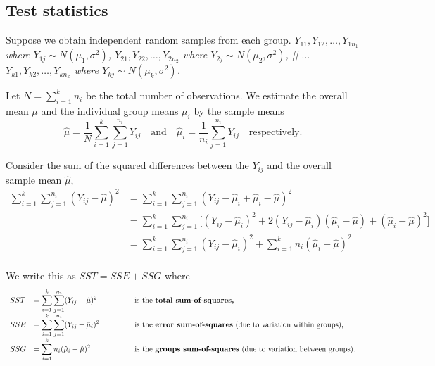 \subsection{Test statistics}

Suppose we obtain independent random samples from each group.
\bit
\it $Y_{11},Y_{12},\ldots,Y_{1n_1}$ where $Y_{1j}\sim N(\mu_1,\sigma^2)$,
\it $Y_{21},Y_{22},\ldots,Y_{2n_2}$ where $Y_{2j}\sim N(\mu_2,\sigma^2)$,
\it[] $\ldots$
\it $Y_{k1}, Y_{k2}, \ldots, Y_{kn_k}$ where $Y_{kj}\sim N(\mu_k,\sigma^2)$.
\eit

Let $N=\sum_{i=1}^k n_i$ be the total number of observations. We estimate the overall mean $\mu$ and the individual group means $\mu_i$ by the sample means
\[
\hat{\mu} = \displaystyle\frac{1}{N}\sum_{i=1}^k\sum_{j=1}^{n_i} Y_{ij}
\quad\text{and}\quad
\hat{\mu}_i = \displaystyle\frac{1}{n_i}\sum_{j=1}^{n_i} Y_{ij}
\quad\text{respectively.}
\]

Consider the sum of the squared differences between the $Y_{ij}$ and the overall sample mean $\hat{\mu}$,
\begin{align*}
\sum_{i=1}^k\sum_{j=1}^{n_i} (Y_{ij}-\hat{\mu})^2
	& = \sum_{i=1}^k\sum_{j=1}^{n_i} (Y_{ij}-\hat{\mu}_i + \hat{\mu}_i-\hat{\mu})^2 \\
	& = \sum_{i=1}^k\sum_{j=1}^{n_i} \big[(Y_{ij}-\hat{\mu}_i)^2 + 2(Y_{ij}-\hat{\mu}_i)(\hat{\mu}_i-\hat{\mu}) + (\hat{\mu}_i-\hat{\mu})^2\big] \\
	& = \sum_{i=1}^k\sum_{j=1}^{n_i} (Y_{ij}-\hat{\mu}_i)^2 + \sum_{i=1}^k n_i(\hat{\mu}_i-\hat{\mu})^2 \\
\end{align*}

We write this as $SST = SSE + SSG$ where
\[
\begin{array}{lll}
SST	& = \displaystyle\sum_{i=1}^k\sum_{j=1}^{n_i} (Y_{ij}-\hat{\mu})^2
\qquad\qquad & \text{is the \textbf{total sum-of-squares,}} \\
SSE	& = \displaystyle\sum_{i=1}^k\sum_{j=1}^{n_i} (Y_{ij}-\hat{\mu}_i)^2
\qquad & \text{is the \textbf{error sum-of-squares} (due to variation within groups),} \\
SSG	& = \displaystyle\sum_{i=1}^k n_i (\hat{\mu}_i-\hat{\mu})^2
\qquad & \text{is the \textbf{groups sum-of-squares} (due to variation between groups).} \\
\end{array}
\]

